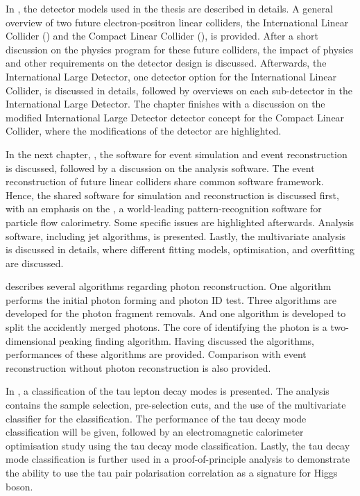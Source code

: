 In , the detector models used in the thesis are described in details. A general overview of two future electron-positron linear colliders, the International Linear Collider (\ILC) and the Compact Linear Collider (\CLIC), is provided. After a short discussion on the physics program for these future colliders, the impact of physics and other requirements on the detector design is discussed. Afterwards, the International Large Detector, one detector option for the International Linear Collider, is discussed in details, followed by overviews on each sub-detector in the International Large Detector. The chapter finishes with a discussion on the modified International Large Detector detector concept for the Compact Linear Collider, where the modifications of the detector are highlighted.

In the next chapter, , the software for event simulation and event reconstruction is  discussed, followed by a discussion on the analysis software. The event reconstruction of future linear colliders share common software framework. Hence, the shared software for simulation and reconstruction is discussed first, with an emphasis on the \pandora, a world-leading pattern-recognition software for particle flow calorimetry. Some \CLIC specific issues are highlighted afterwards. Analysis software, including jet algorithms, is presented. Lastly, the multivariate analysis is discussed in details, where different fitting models, optimisation, and overfitting are discussed.


 describes several \pandora algorithms regarding photon reconstruction. One algorithm performs the initial photon forming and photon ID test. Three algorithms are developed for the photon fragment removals. And one algorithm is developed to split the accidently merged photons. The core of identifying the photon is a two-dimensional peaking finding algorithm. Having discussed the algorithms, performances of these algorithms are provided. Comparison with event reconstruction without photon reconstruction is also provided.

In , a classification of the tau lepton decay modes is presented. The analysis contains the sample selection, pre-selection cuts, and the use of the multivariate classifier for the classification.  The performance of the tau decay mode classification will be given, followed by an electromagnetic calorimeter optimisation study using the tau decay mode classification. Lastly, the  tau decay mode classification is further used in a proof-of-principle analysis to demonstrate the ability to use the tau pair polarisation correlation as a signature for Higgs boson.

